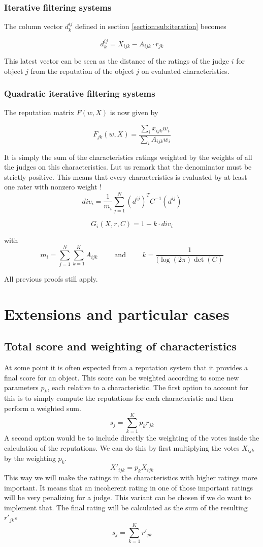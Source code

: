 \documentclass[12pt,a4paper]{article}
\begin{document}
\subsubsection{Iterative filtering systems}
 The column vector $d_k^{ij}$ defined in section \ref{section:sub:iteration} becomes
 
\[
    d^{ij}_k = X_{ijk} - A_{ijk}   \cdot r_{jk}
\]

This latest vector can be seen as the distance of the ratings of the judge $i$ for object $j$ from the reputation of the object $j$ on evaluated characteristics.

\subsubsection{Quadratic iterative filtering systems}

The reputation matrix $F(w, X)$ is now given by

\[
    F_{jk}(w, X) = \frac{\sum_i x_{ijk}w_i}{\sum_i A_{ijk}w_i}
\]

It is simply the sum of the characteristics ratings weighted by the weights of all the judges on this characteristics. Lut us remark that the denominator must be strictly positive. This means that every characteristics is evaluated by at least one rater with nonzero weight !\\

\[
    div_i = \frac{1}{m_i} \sum_{j=1}^{N} (d^{ij})^TC^{-1}(d^{ij})
\]

\[
    G_i(X, r, C) = 1 - k \cdot div_i
\]

with
\[
    m_i = \sum_{j=1}^{N} \sum_{k=1}^{K} A_{ijk} \qquad \text{ and } \qquad k = \frac{1}{(\log(2\pi)\det(C)}
\]

All previous proofs still apply.


\section{Extensions and particular cases}
\subsection{Total score and weighting of characteristics}
At some point it is often expected from a reputation system that it provides a final score for an object. This score can be weighted according to some new parameters $p_k$, each relative to a characteristic.
The first option to account for this is to simply compute the reputations for each characteristic and then perform a weighted sum.
$$ s_j = \sum_{k=1}^K p_k r_{jk} $$
A second option would be to include directly the weighting of the votes inside the calculation of the reputations. We can do this by first multiplying the votes $X_{ijk}$ by the weighting $p_k$. 
$$X'_{ijk} = p_k X_{ijk}$$
This way we will make the ratings in the characteristics with higher ratings more important. It means that an incoherent rating in one of those important ratings will be very penalizing for a judge. This variant can be chosen if we do want to implement that.
The final rating will be calculated as the sum of the resulting $r'_{jk}$s
$$ s_j = \sum_{k=1}^K r'_{jk}$$
\end{document}
